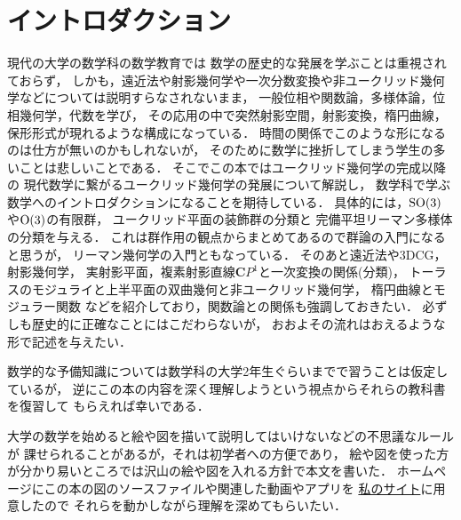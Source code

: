 \chapter{イントロダクション}

現代の大学の数学科の数学教育では
数学の歴史的な発展を学ぶことは重視されておらず，
しかも，遠近法や射影幾何学や一次分数変換や非ユークリッド幾何学などについては説明すらなされないまま，
一般位相や関数論，多様体論，位相幾何学，代数を学び，
その応用の中で突然射影空間，射影変換，楕円曲線，保形形式が現れるような構成になっている．
時間の関係でこのような形になるのは仕方が無いのかもしれないが，
そのために数学に挫折してしまう学生の多いことは悲しいことである．
そこでこの本ではユークリッド幾何学の完成以降の
現代数学に繋がるユークリッド幾何学の発展について解説し，
数学科で学ぶ数学へのイントロダクションになることを期待している．
具体的には，$\operatorname{SO}(3)$や$\operatorname{O}(3)$の有限群，
ユークリッド平面の装飾群の分類と
完備平坦リーマン多様体の分類を与える．
これは群作用の観点からまとめてあるので群論の入門になると思うが，
リーマン幾何学の入門ともなっている．
そのあと遠近法や3DCG，射影幾何学，
実射影平面，複素射影直線$\mathbf CP^1$と一次変換の関係(分類)，
トーラスのモジュライと上半平面の双曲幾何と非ユークリッド幾何学，
楕円曲線とモジュラー関数
などを紹介しており，関数論との関係も強調しておきたい．
必ずしも歴史的に正確なことにはこだわらないが，
おおよその流れはおえるような形で記述を与えたい．

数学的な予備知識については数学科の大学2年生ぐらいまでで習うことは仮定しているが，
逆にこの本の内容を深く理解しようという視点からそれらの教科書を復習して
もらえれば幸いである．

大学の数学を始めると絵や図を描いて説明してはいけないなどの不思議なルールが
課せられることがあるが，それは初学者への方便であり，
絵や図を使った方が分かり易いところでは沢山の絵や図を入れる方針で本文を書いた．
ホームページにこの本の図のソースファイルや関連した動画やアプリを
\href{https://snow00two.github.io/mySite/}{私のサイト}に用意したので
それらを動かしながら理解を深めてもらいたい．